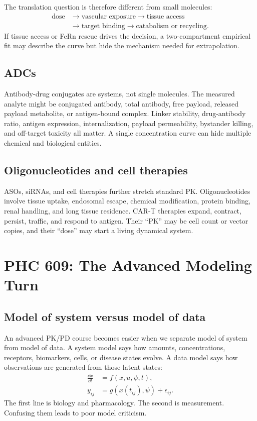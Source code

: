 \documentclass[a4paper]{article}
\begin{document}
The translation question is therefore different from small molecules:
\[
  \begin{aligned}
  \text{dose}
  &\to
  \text{vascular exposure}
  \to
  \text{tissue access}\\
  &\to
  \text{target binding}
  \to
  \text{catabolism or recycling}.
  \end{aligned}
\]
If tissue access or FcRn rescue drives the decision, a two-compartment empirical fit may describe the curve but hide the mechanism needed for extrapolation.

\subsection{ADCs}

Antibody-drug conjugates are systems, not single molecules. The measured analyte might be conjugated antibody, total antibody, free payload, released payload metabolite, or antigen-bound complex. Linker stability, drug-antibody ratio, antigen expression, internalization, payload permeability, bystander killing, and off-target toxicity all matter. A single concentration curve can hide multiple chemical and biological entities.

\subsection{Oligonucleotides and cell therapies}

ASOs, siRNAs, and cell therapies further stretch standard PK. Oligonucleotides involve tissue uptake, endosomal escape, chemical modification, protein binding, renal handling, and long tissue residence. CAR-T therapies expand, contract, persist, traffic, and respond to antigen. Their ``PK'' may be cell count or vector copies, and their ``dose'' may start a living dynamical system.

\section{PHC 609: The Advanced Modeling Turn}

\subsection{Model of system versus model of data}

An advanced PK/PD course becomes easier when we separate model of system from model of data. A system model says how amounts, concentrations, receptors, biomarkers, cells, or disease states evolve. A data model says how observations are generated from those latent states:
\[
  \begin{aligned}
  \frac{\dd x}{\dd t} &= f(x,u,\psi,t),\\
  y_{ij} &= g(x(t_{ij}),\psi)+\epsilon_{ij}.
  \end{aligned}
\]
The first line is biology and pharmacology. The second is measurement. Confusing them leads to poor model criticism.
\end{document}
